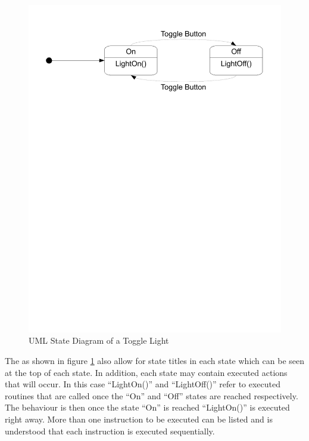 \begin{figure}[htp]
    \centering
    \includegraphics[trim= 15mm 200mm 15mm 10mm, clip, width=\imgmedium]{./images/state_uml_light.pdf} 
    \caption{UML State Diagram of a Toggle Light}
    \label{fig:state_uml_light}
\end{figure}

The \cite{UML2} as shown in figure \ref{fig:state_uml_light} also allow for state titles in each state which can be seen at the top of each state. In addition, each state may contain executed actions that will occur. In this case ``LightOn()'' and ``LightOff()'' refer to executed routines that are called once the ``On'' and ``Off'' states are reached respectively. The behaviour is then once the state ``On'' is reached ``LightOn()'' is executed right away. More than one instruction to be executed can be listed and is understood that each instruction is executed sequentially\cite{UML2}.


